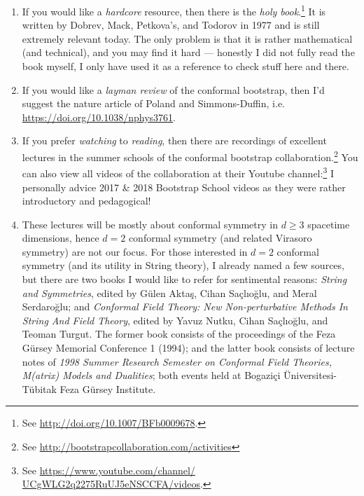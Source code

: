 \begin{enumerate}
	\item If you would like a \emph{hardcore} resource, then there is the \emph{holy book}.\footnote{See \hyperref{http://doi.org/10.1007/BFb0009678}{}{}{http://doi.org/10.1007/BFb0009678}.} It is written by Dobrev, Mack, Petkova's, and Todorov in 1977 and is still extremely relevant today. The only problem is that it is rather mathematical (and technical), and you may find it hard --- honestly I did not fully read the book myself, I only have used it as a reference to check stuff here and there. 
	\item If you would like a \emph{layman review} of the conformal bootstrap, then I'd suggest the nature article of Poland and Simmons-Duffin, i.e. \hyperref{https://doi.org/10.1038/nphys3761}{}{}{https://doi.org/10.1038/nphys3761}.
	
	\item If you prefer \emph{watching} to \emph{reading}, then there are recordings of excellent lectures in the summer schools of the conformal bootstrap collaboration.\footnote{See \hyperref{http://bootstrapcollaboration.com/activities}{}{}{http://bootstrapcollaboration.com/activities}} You can also view all videos of the collaboration at their Youtube channel:\footnote{See \hyperref{https://www.youtube.com/channel/UCgWLG2q2275RuUJ5eNSCCFA/videos}{}{}{https://www.youtube.com/channel/ UCgWLG2q2275RuUJ5eNSCCFA/videos}.} I personally advice 2017 \& 2018 Bootstrap School videos as they were rather introductory and pedagogical!
	
	\item These lectures will be mostly about conformal symmetry in $d\ge 3$ spacetime dimensions, hence $d=2$ conformal symmetry (and related Virasoro symmetry) are not our focus. For those interested in $d=2$ conformal symmetry (and its utility in String theory), I already named a few sources, but there are two books I would like to refer for sentimental reasons:  \emph{String and Symmetries}, edited by Gülen Aktaş, Cihan Saçlıoğlu, and Meral Serdaroğlu; and \emph{Conformal Field Theory: New Non-perturbative Methods In String And Field Theory}, edited by Yavuz Nutku, Cihan Saçlıoğlu, and Teoman Turgut. The former book consists of the proceedings of the Feza Gürsey Memorial Conference 1 (1994); and the latter book consists of lecture notes of  \emph{1998 Summer Research Semester on Conformal Field Theories, M(atrix) Models and Dualities}; both events held at Bogaziçi Üniversitesi-Tübitak Feza Gürsey Institute.
	

\end{enumerate}
